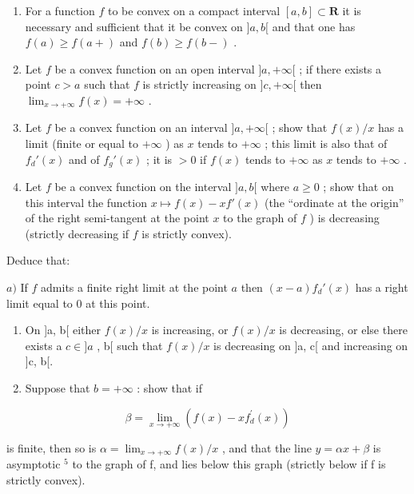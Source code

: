 \begin{enumerate}
\def\labelenumi{\arabic{enumi})}
\setcounter{enumi}{3}
\item
  For a function \(f\) to be convex on a compact interval \([a, b] \subset \mathbf{R}\) it is necessary and sufficient that it be convex on \(]a, b[\) and that one has \(f(a) \geqslant f(a+)\) and \(f(b) \geqslant f(b-)\) .
\item
  Let \(f\) be a convex function on an open interval \(]a, +\infty[\) ; if there exists a point \(c > a\) such that \(f\) is strictly increasing on \(]c, +\infty[\) then \(\lim_{x \to +\infty} f(x) = +\infty\) .
\item
  Let \(f\) be a convex function on an interval \(]a, +\infty[\) ; show that \(f(x)/x\) has a limit (finite or equal to \(+\infty\) ) as \(x\) tends to \(+\infty\) ; this limit is also that of \(f_d'(x)\) and of \(f_g'(x)\) ; it is \(>0\) if \(f(x)\) tends to \(+\infty\) as \(x\) tends to \(+\infty\) .
\item
  Let \(f\) be a convex function on the interval \(]a, b[\) where \(a \geqslant 0\) ; show that on this interval the function \(x \mapsto f(x) - xf'(x)\) (the ``ordinate at the origin'' of the right semi-tangent at the point \(x\) to the graph of \(f\) ) is decreasing (strictly decreasing if \(f\) is strictly convex).
\end{enumerate}

Deduce that:

\(a)\) If \(f\) admits a finite right limit at the point \(a\) then \((x - a)f_d'(x)\) has a right limit equal to 0 at this point.

\begin{enumerate}
\def\labelenumi{\alph{enumi})}
\setcounter{enumi}{1}
\item
  On {]}a, b{[} either \(f(x)/x\) is increasing, or \(f(x)/x\) is decreasing, or else there exists a \(c \in ]a\) , b{[} such that \(f(x)/x\) is decreasing on {]}a, c{[} and increasing on {]}c, b{[}.
\item
  Suppose that \(b = +\infty\) : show that if
\end{enumerate}

\[
\beta = \lim _ {x \rightarrow + \infty} \left(f (x) - x f _ {d} ^ {\prime} (x)\right)
\]

is finite, then so is \(\alpha = \lim_{x \to +\infty} f(x) / x\) , and that the line \(y = \alpha x + \beta\) is asymptotic \(^{5}\) to the graph of f, and lies below this graph (strictly below if f is strictly convex).

